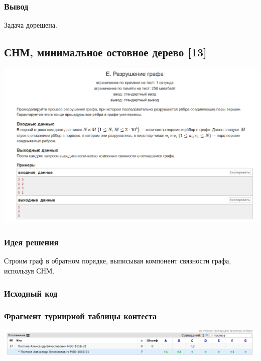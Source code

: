 \subsubsection*{Вывод}
Задача дорешена.

\vspace{20pt}

\pagebreak

\subsection*{СНМ, минимальное остовное дерево [13]}
\begin{center}
\includegraphics[width=\textwidth]{statements/15.png}
\end{center}
\subsubsection*{Идея решения}
Строим граф в обратном порядке, выписывая компонент связности графа, используя СНМ.
\subsubsection*{Исходный код}


\subsubsection*{Фрагмент турнирной таблицы контеста}
\begin{center}
\includegraphics[width=\textwidth]{standings/15.png}\newline\noindent
\end{center}

